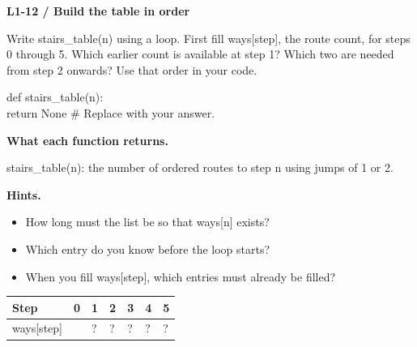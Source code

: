 \documentclass[11pt,a4paper]{article}
\begin{document}
\par\noindent\begin{minipage}{\linewidth}
\textbf{L1-12 / Build the table in order}\par\smallskip Write stairs\_table(n) using a loop. First fill ways[step], the route count, for steps 0 through 5. Which earlier count is available at step 1? Which two are needed from step 2 onwards? Use that order in your code.\par
\par{}\par\smallskip\noindent\colorbox{codepaper}{\parbox{\dimexpr\linewidth-2\fboxsep\relax}{\small\ttfamily\raggedright def stairs\_table(n):\\\hspace*{2.4em}return None  \# Replace with your answer.}}\par
{\small\textbf{What each function returns.}\par stairs\_table(n): the number of ordered routes to step n using jumps of 1 or 2.\par }
{\small\textbf{Hints.}}\begin{itemize}\item How long must the list be so that ways[n] exists?\item Which entry do you know before the loop starts?\item When you fill ways[step], which entries must already be filled?\end{itemize}
\par\smallskip \begingroup\small\setlength{\tabcolsep}{4pt}\renewcommand{\arraystretch}{1.35}\begin{tabularx}{\linewidth}{>{\raggedright\arraybackslash}l>{\raggedright\arraybackslash}X>{\raggedright\arraybackslash}X>{\raggedright\arraybackslash}X>{\raggedright\arraybackslash}X>{\raggedright\arraybackslash}X>{\raggedright\arraybackslash}X}\toprule\textbf{Step} & \textbf{0} & \textbf{1} & \textbf{2} & \textbf{3} & \textbf{4} & \textbf{5}\\\midrule
ways[step] & 1 & ? & ? & ? & ? & ?\\
\bottomrule\end{tabularx}\endgroup\par\smallskip 
\end{minipage}\par\vspace{2mm}
\end{document}
